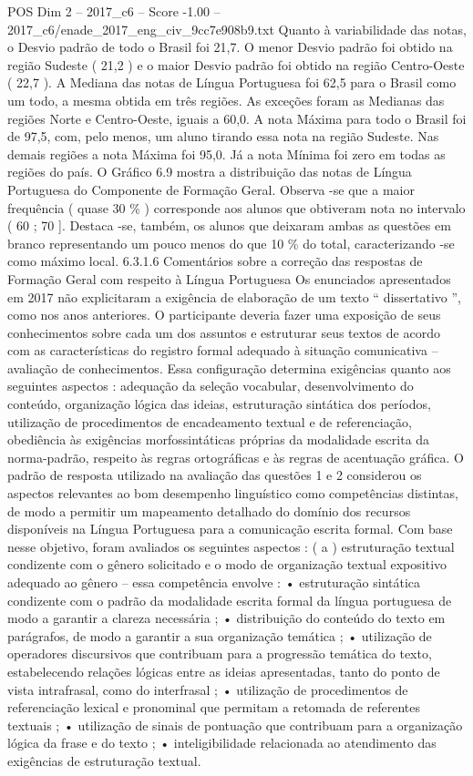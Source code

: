 \begin{textsample}{POS Dim 2 – 2017\_c6 – Score -1.00 – 2017\_c6/enade\_2017\_eng\_civ\_9cc7e908b9.txt}
Quanto à variabilidade das notas, o Desvio padrão de todo o Brasil foi 21,7.
O menor Desvio padrão foi obtido na região Sudeste ( 21,2 ) e o maior Desvio padrão foi obtido na região Centro-Oeste ( 22,7 ).
A Mediana das notas de Língua Portuguesa foi 62,5 para o Brasil como um todo, a mesma obtida em três regiões.
As exceções foram as Medianas das regiões Norte e Centro-Oeste, iguais a 60,0.
A nota Máxima para todo o Brasil foi de 97,5, com, pelo menos, um aluno tirando essa nota na região Sudeste.
Nas demais regiões a nota Máxima foi 95,0.
Já a nota Mínima foi zero em todas as regiões do país.
O Gráfico 6.9 mostra a distribuição das notas de Língua Portuguesa do Componente de Formação Geral.
Observa -se que a maior frequência ( quase 30 \% ) corresponde aos alunos que obtiveram nota no intervalo ( 60 ; 70 ].
Destaca -se, também, os alunos que deixaram ambas as questões em branco representando um pouco menos do que 10 \% do total, caracterizando -se como máximo local. 6.3.1.6 Comentários sobre a correção das respostas de Formação Geral com respeito à Língua Portuguesa Os enunciados apresentados em 2017 não explicitaram a exigência de elaboração de um texto “ dissertativo ”, como nos anos anteriores.
O participante deveria fazer uma exposição de seus conhecimentos sobre cada um dos assuntos e estruturar seus textos de acordo com as características do registro formal adequado à situação comunicativa – avaliação de conhecimentos.
Essa configuração determina exigências quanto aos seguintes aspectos : adequação da seleção vocabular, desenvolvimento do conteúdo, organização lógica das ideias, estruturação sintática dos períodos, utilização de procedimentos de encadeamento textual e de referenciação, obediência às exigências morfossintáticas próprias da modalidade escrita da norma-padrão, respeito às regras ortográficas e às regras de acentuação gráfica.
O padrão de resposta utilizado na avaliação das questões 1 e 2 considerou os aspectos relevantes ao bom desempenho linguístico como competências distintas, de modo a permitir um mapeamento detalhado do domínio dos recursos disponíveis na Língua Portuguesa para a comunicação escrita formal.
Com base nesse objetivo, foram avaliados os seguintes aspectos : ( a ) estruturação textual condizente com o gênero solicitado e o modo de organização textual expositivo adequado ao gênero – essa competência envolve : • estruturação sintática condizente com o padrão da modalidade escrita formal da língua portuguesa de modo a garantir a clareza necessária ; • distribuição do conteúdo do texto em parágrafos, de modo a garantir a sua organização temática ; • utilização de operadores discursivos que contribuam para a progressão temática do texto, estabelecendo relações lógicas entre as ideias apresentadas, tanto do ponto de vista intrafrasal, como do interfrasal ; • utilização de procedimentos de referenciação lexical e pronominal que permitam a retomada de referentes textuais ; • utilização de sinais de pontuação que contribuam para a organização lógica da frase e do texto ; • inteligibilidade relacionada ao atendimento das exigências de estruturação textual.

\end{textsample}
